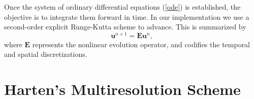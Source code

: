 \documentclass[12pt,letterpaper]{article}
\begin{document}
        Once the system of ordinary differential equations (\ref{ode}) is
        established, the objective is to integrate them forward in time. In our
        implementation we use a second-order explicit Runge-Kutta scheme to
        advance. This is summarized by
        \begin{equation}
            \bm{u}^{n+1} = \bm{E} \bm{u}^{n},
        \end{equation}
        where $\bm{E}$ represents the nonlinear evolution operator, and codifies the
        temporal and spatial discretizations.

\section{Harten's Multiresolution Scheme}
\end{document}
